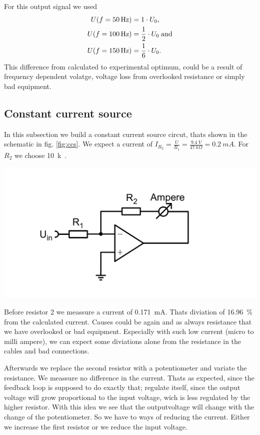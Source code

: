 \documentclass[a4paper,10pt]{article}
\newenvironment{Figure}
        {\par\medskip\noindent\minipage{\linewidth}}
        {\endminipage\par\medskip}
\numberwithin{equation}{section}
\begin{document}
\begin{multicols}{2}
\begin{Figure}
		\label{fig:foundsaw}
	\end{Figure}
	For this output signal we used
	\begin{align*}
		U(f=\SI{50}{Hz})  & =1\cdot U_0\text{,}               \\
		U(f=\SI{100}{Hz}) & =\frac{1}{2}\cdot U_0\text{\;and} \\
		U(f=\SI{150}{Hz}) & =\frac{1}{6}\cdot U_0\text{.}
	\end{align*}
	This difference from calculated to experimental optimum, could be a result of frequency dependent volatge, voltage loss from overlooked resistance or simply bad equipment.
	\subsection{Constant current source}
	In this subsection we build a constant current source circut, thats shown in the schematic in fig. \ref{fig:ccs}. We expect a current of $I_{R_2}=\frac{U}{R_1}=\frac{\SI{9.4}{V}}{\SI{47}{k\Omega}}=\SI{0.2}{mA}$. For $R_2$ we choose \SI{10}{k\Omega}.
	\begin{Figure}
		\centering
		\includegraphics[width=1\textwidth]{conscurrentshematic.png}
		\label{fig:ccs}
	\end{Figure}
	Before resistor 2 we meassure a current of \SI{0.171}{\milli A}. Thats diviation of \SI{16.96}{\%} from the calculated current. Causes could be again and as always resistance that we have overlooked or bad equipment. Especially with such low current (micro to milli ampere), we can expect some diviations alone from the resistance in the cables and bad connections.

	Afterwards we replace the second resistor with a potentiometer and variate the resistance. We meassure no difference in the current. Thats as expected, since the feedback loop is supposed to do exactly that; regulate itself, since the output voltage will grow proportional to the input voltage, wich is less regulated by the higher resistor. With this idea we see that the outputvoltage will change with the change of the potentiometer. So we have to ways of reducing the current. Either we increase the first resistor or we reduce the input voltage.


\end{multicols}
\end{document}
